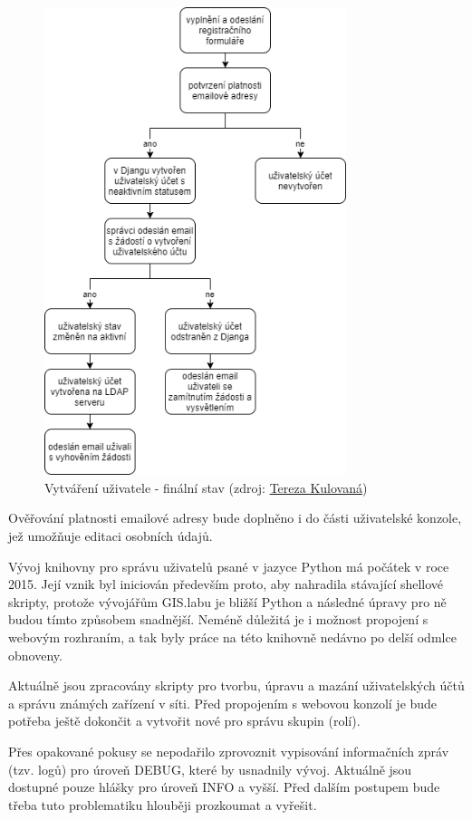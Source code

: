 \begin{figure}[H] \centering
    \includegraphics[width=250pt]{./pictures/my_console_final_version_cz.png}
    \caption[Vytváření uživatele - finální stav]{Vytváření uživatele - finální stav (zdroj:
	\href{}{Tereza Kulovaná})}
    \label{fig:admin-final}
\end{figure}

Ověřování platnosti emailové adresy bude doplněno i do části uživatelské konzole, jež umožňuje editaci osobních údajů.

Vývoj knihovny pro správu uživatelů psané v jazyce Python má počátek v roce 2015. Její vznik byl iniciován především proto, aby nahradila stávající shellové skripty, protože vývojářům GIS.labu je bližší Python a následné úpravy pro ně budou tímto způsobem snadnější. Neméně důležitá je i možnost propojení s webovým rozhraním, a tak byly práce na této knihovně nedávno po delší odmlce obnoveny. 

Aktuálně jsou zpracovány skripty pro tvorbu, úpravu a mazání uživatelských účtů a správu známých zařízení v síti.  Před propojením s webovou konzolí je bude potřeba ještě dokončit a vytvořit nové pro správu skupin (rolí). 
  
Přes opakované pokusy se nepodařilo zprovoznit vypisování informačních zpráv (tzv. logů) pro úroveň DEBUG, které by usnadnily vývoj. Aktuálně jsou dostupné pouze hlášky pro úroveň INFO a vyšší. Před dalším postupem bude třeba tuto problematiku hlouběji prozkoumat a vyřešit. 

